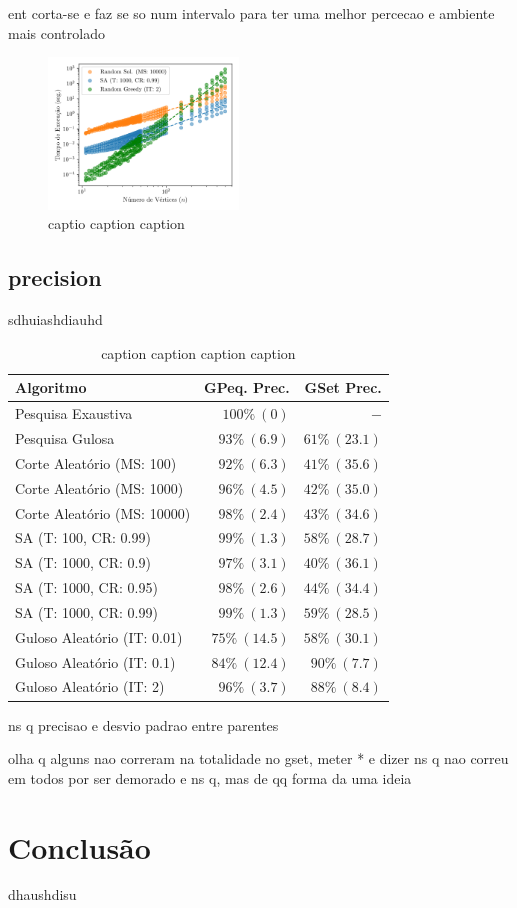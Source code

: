 \documentclass[mirror, portugues]{revdetua}
\begin{document}
ent corta-se e faz se so num intervalo para ter uma melhor percecao e ambiente mais controlado

\begin{figure}[H]
    \centering
    \includegraphics[width=0.45\textwidth]{../assets/time_interval.png}
    \caption{captio caption caption}
    \label{fig:time_interval}
\end{figure}



\subsection{precision}

sdhuiashdiauhd


\begin{table}[H]
\centering
\caption{caption caption caption caption}
\label{table:precision}
\begin{tabular}{lrr}
\toprule
\textbf{Algoritmo} & \textbf{GPeq. Prec.} & \textbf{GSet Prec.} \\
\midrule
Pesquisa Exaustiva & $100\% \ (0)$ & $-$ \\
Pesquisa Gulosa & $93\% \ (6.9)$ & $61\% \ (23.1)$ \\
Corte Aleatório (MS: 100) & $92\% \ (6.3)$ & $41\% \ (35.6)$ \\
Corte Aleatório (MS: 1000) & $96\% \ (4.5)$ & $42\% \ (35.0)$ \\
Corte Aleatório (MS: 10000) & $98\% \ (2.4)$ & $43\% \ (34.6)$ \\
SA (T: 100, CR: 0.99) & $99\% \ (1.3)$ & $58\% \ (28.7)$ \\
SA (T: 1000, CR: 0.9) & $97\% \ (3.1)$ & $40\% \ (36.1)$ \\
SA (T: 1000, CR: 0.95) & $98\% \ (2.6)$ & $44\% \ (34.4)$ \\
SA (T: 1000, CR: 0.99) & $99\% \ (1.3)$ & $59\% \ (28.5)$ \\
Guloso Aleatório (IT: 0.01) & $75\% \ (14.5)$ & $58\% \ (30.1)$ \\
Guloso Aleatório (IT: 0.1) & $84\% \ (12.4)$ & $90\% \ (7.7)$ \\
Guloso Aleatório (IT: 2) & $96\% \ (3.7)$ & $88\% \ (8.4)$ \\
\bottomrule
\end{tabular}
\end{table}


ns q precisao e desvio padrao entre parentes

olha q alguns nao correram na totalidade no gset, meter * e dizer ns q nao correu em todos por ser demorado e ns q, mas de qq forma da uma ideia

\section{Conclusão}

dhaushdisu




\end{document}

